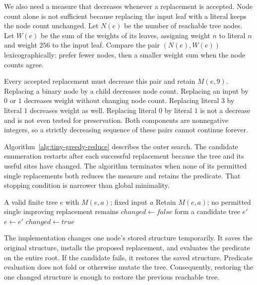 We also need a measure that decreases whenever a replacement is accepted.
Node count alone is not sufficient because replacing the input leaf with a literal keeps the node count unchanged.
Let $N(e)$ be the number of reachable tree nodes.
Let $W(e)$ be the sum of the weights of its leaves, assigning weight $n$ to literal $n$ and weight $256$ to the input leaf.
Compare the pair $(N(e),W(e))$ lexicographically: prefer fewer nodes, then a smaller weight sum when the node counts agree.

Every accepted replacement must decrease this pair and retain $M(e,9)$.
Replacing a binary node by a child decreases node count.
Replacing an input by $0$ or $1$ decreases weight without changing node count.
Replacing literal $3$ by literal $1$ decreases weight as well.
Replacing literal $0$ by literal $1$ is not a decrease and is not even tested for preservation.
Both components are nonnegative integers, so a strictly decreasing sequence of these pairs cannot continue forever.

Algorithm~\ref{alg:tiny-greedy-reduce} describes the outer search.
The candidate enumeration restarts after each successful replacement because the tree and its useful sites have changed.
The algorithm terminates when none of its permitted single replacements both reduces the measure and retains the predicate.
That stopping condition is narrower than global minimality.

\begin{algorithm}
  \caption{Reduce a failing tree using a fixed set of local replacements.}
  \label{alg:tiny-greedy-reduce}
  \begin{pseudocode}
    \Require A valid finite tree $e$ with $M(e,a)$; fixed input $a$
    \Ensure Retain $M(e,a)$; no permitted single improving replacement remains
    \Repeat
      \State $\mathit{changed}\gets\mathit{false}$
        \State form a candidate tree $e'$
          \State $e\gets e'$
          \State $\mathit{changed}\gets\mathit{true}$
          \State \Break
        \EndIf
      \EndFor
  \end{pseudocode}
\end{algorithm}

The implementation changes one node's stored structure temporarily.
It saves the original structure, installs the proposed replacement, and evaluates the predicate on the entire root.
If the candidate fails, it restores the saved structure.
Predicate evaluation does not fold or otherwise mutate the tree.
Consequently, restoring the one changed structure is enough to restore the previous reachable tree.

